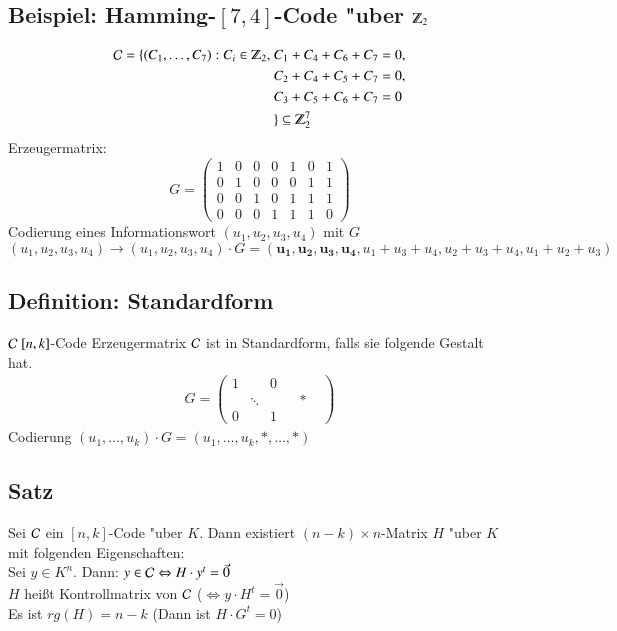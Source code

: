 \subsection{Beispiel: Hamming-$[7,4]$-Code "uber $\Z_2$}

\begin{align*}
	\Code = \lbrace (C_1,\ldots,C_7) : C_i \in \Z_2,\
		&C_1 + C_4 + C_6 + C_7 = 0,\\
		&C_2 + C_4 + C_5 + C_7 = 0,\\
		&C_3 + C_5 + C_6 + C_7 = 0\\
		&\rbrace \subseteq \Z_2^7
\end{align*}
Erzeugermatrix:
\[	G=
	\begin{pmatrix}
		1 & 0 & 0 & 0 & 1 & 0 & 1\\
		0 & 1 & 0 & 0 & 0 & 1 & 1\\
		0 & 0 & 1 & 0 & 1 & 1 & 1\\
		0 & 0 & 0 & 1 & 1 & 1 & 0
	\end{pmatrix}
\]
Codierung eines Informationswort $(u_1,u_2,u_3,u_4)$ mit $G$
\[
	(u_1,u_2,u_3,u_4) \rightarrow (u_1,u_2,u_3,u_4) \cdot G =  (\mathbf{u_1,u_2,u_3,u_4},u_1+u_3+u_4,u_2+u_3+u_4,u_1+u_2+u_3)
\]
\subsection{Definition: Standardform}
$\mathcal{C} \  [n,k]$-Code Erzeugermatrix $\mathcal{C}$ ist in Standardform, falls sie folgende Gestalt hat.
\begin{align*}
	G= 
	\begin{pmatrix}
		1 & & 0\\
		 & \ddots & & & * & \\
		0 & & 1 & &
	\end{pmatrix}
\end{align*}
Codierung $(u_1,\ldots,u_k) \cdot G = (u_1,\ldots,u_k,*,\ldots,*)$

\subsection{Satz}
Sei $\mathcal{C}$ ein $[n,k]$-Code "uber $K$. Dann existiert $(n-k)\times n$-Matrix $H$ "uber $K$ mit folgenden Eigenschaften: \\
Sei $y\in K^n$. Dann: $y \in \mathcal{C} \Leftrightarrow H \cdot y^t = \vec{0}$ 
\\
$H$ hei\ss t Kontrollmatrix von $\mathcal{C}$ ($\Leftrightarrow y \cdot H^t = \vec{0}$) \\
Es ist $rg(H)=n-k$ (Dann ist $H \cdot G^t=0$)

